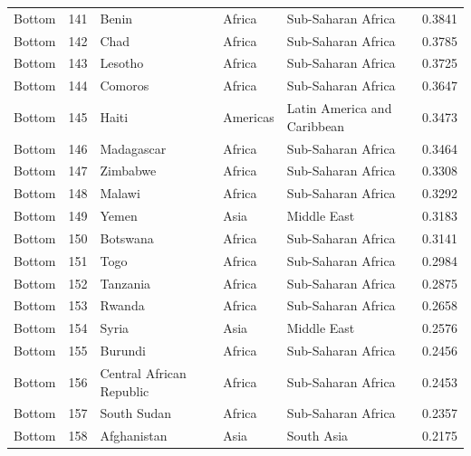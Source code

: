 \begin{table}
\begin{tabular}{lrlllr}
Bottom & 141 & Benin & Africa & Sub-Saharan Africa & 0.3841 \\
Bottom & 142 & Chad & Africa & Sub-Saharan Africa & 0.3785 \\
Bottom & 143 & Lesotho & Africa & Sub-Saharan Africa & 0.3725 \\
Bottom & 144 & Comoros & Africa & Sub-Saharan Africa & 0.3647 \\
Bottom & 145 & Haiti & Americas & Latin America and Caribbean & 0.3473 \\
Bottom & 146 & Madagascar & Africa & Sub-Saharan Africa & 0.3464 \\
Bottom & 147 & Zimbabwe & Africa & Sub-Saharan Africa & 0.3308 \\
Bottom & 148 & Malawi & Africa & Sub-Saharan Africa & 0.3292 \\
Bottom & 149 & Yemen & Asia & Middle East & 0.3183 \\
Bottom & 150 & Botswana & Africa & Sub-Saharan Africa & 0.3141 \\
Bottom & 151 & Togo & Africa & Sub-Saharan Africa & 0.2984 \\
Bottom & 152 & Tanzania & Africa & Sub-Saharan Africa & 0.2875 \\
Bottom & 153 & Rwanda & Africa & Sub-Saharan Africa & 0.2658 \\
Bottom & 154 & Syria & Asia & Middle East & 0.2576 \\
Bottom & 155 & Burundi & Africa & Sub-Saharan Africa & 0.2456 \\
Bottom & 156 & Central African Republic & Africa & Sub-Saharan Africa & 0.2453 \\
Bottom & 157 & South Sudan & Africa & Sub-Saharan Africa & 0.2357 \\
Bottom & 158 & Afghanistan & Asia & South Asia & 0.2175 \\
\bottomrule
\end{tabular}
\end{table}
